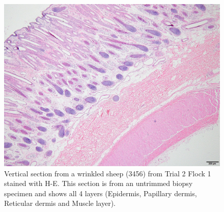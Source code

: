 %

\begin{figure}[!h]
  \centering
  \includegraphics[width=1.0\textwidth]{3456_4layers_4x.jpg}
  \caption{Vertical section from a wrinkled sheep (3456) from Trial 2 Flock 1 stained with H-E. This section is from an untrimmed biopsy specimen and shows all 4 layers (Epidermis, Papillary dermis, Reticular dermis and Muscle layer).}
  \label{fig:trial2he}
\end{figure}

%

